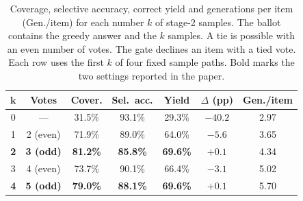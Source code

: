 \begin{table}[t]
\small\setlength{\tabcolsep}{3pt}
\caption{Coverage, selective accuracy, correct yield and generations per item (Gen./item) for each number $k$ of stage-2 samples. The ballot contains the greedy answer and the $k$ samples. A tie is possible with an even number of votes. The gate declines an item with a tied vote. Each row uses the first $k$ of four fixed sample paths. Bold marks the two settings reported in the paper.\label{tab:ksweep}}
\begin{tabularx}{\textwidth}{CCCCCCC}
\toprule
$\boldsymbol{k}$ & \textbf{Votes} & \textbf{Cover.} & \textbf{Sel.\ acc.} & \textbf{Yield} & \textbf{$\Delta$ (pp)} & \textbf{Gen./item} \\
 & --- & 31.5\% & 93.1\% & 29.3\% & $-40.2$ & 2.97 \\
1 & 2 (even) & 71.9\% & 89.0\% & 64.0\% & $-5.6$ & 3.65 \\
\textbf{2} & \textbf{3 (odd)} & \textbf{81.2\%} & \textbf{85.8\%} & \textbf{69.6\%} & \textbf{$+0.1$} & 4.34 \\
3 & 4 (even) & 73.7\% & 90.1\% & 66.4\% & $-3.1$ & 5.02 \\
\textbf{4} & \textbf{5 (odd)} & \textbf{79.0\%} & \textbf{88.1\%} & \textbf{69.6\%} & \textbf{$+0.1$} & 5.70 \\
\bottomrule
\end{tabularx}
\end{table}
